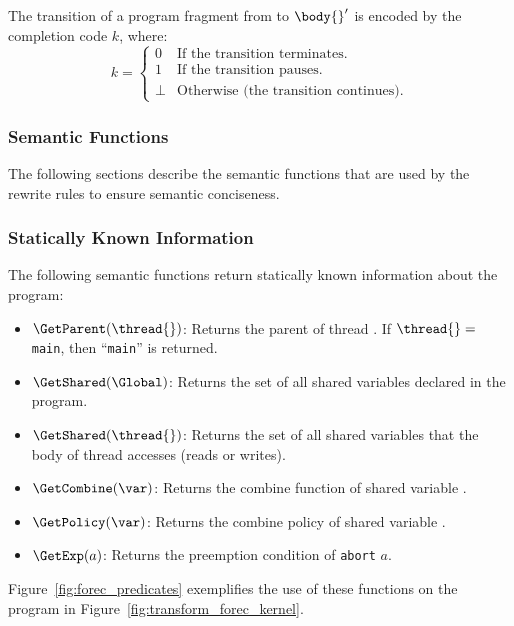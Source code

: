 The transition of a program fragment from \body{} to $\body{}'$ 
is encoded by the completion code $k$, where:
\begin{equation*}
	k = \begin{cases}
		0		& \text{If the transition terminates.}			\\
		1		& \text{If the transition pauses.}				\\
		\bot	& \text{Otherwise (the transition continues).}
	\end{cases}
\end{equation*}


\subsubsection{Semantic Functions}
The following sections describe the semantic functions that are 
used by the rewrite rules to ensure semantic conciseness.

\subsubsection{Statically Known Information}
The following semantic functions return statically known 
information about the program:
\begin{itemize}
	\item $\GetParent(\thread{})$:
		Returns the parent of thread \thread{}.
		If $\thread{} =$ \verb$main$, then ``\verb$main$'' is returned.
	\item $\GetShared(\Global)$:
		Returns the set of all shared variables declared in the program.
	\item $\GetShared(\thread{})$:
		Returns the set of all shared variables that the body of thread \thread{} accesses (reads or writes).
	\item $\GetCombine(\var)$:
		Returns the combine function of shared variable \var{}.
	\item $\GetPolicy(\var)$:
		Returns the combine policy of shared variable \var{}.
	\item $\GetExp(a)$:
		Returns the preemption condition \expression{} of \verb$abort$ $a$.
\end{itemize}
Figure~\ref{fig:forec_predicates} exemplifies the use of these functions on
the program in Figure~\ref{fig:transform_forec_kernel}.

